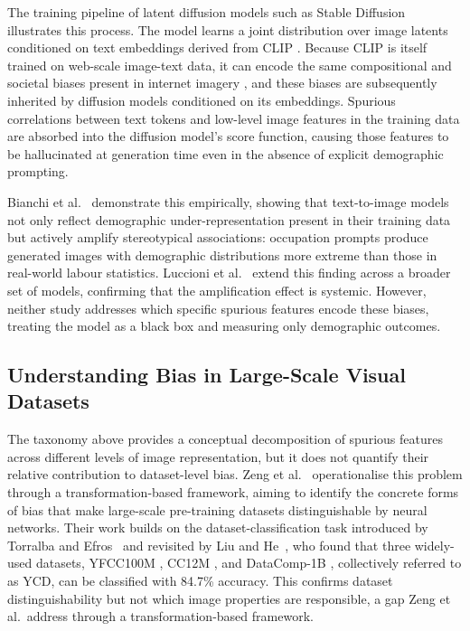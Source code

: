 The training pipeline of latent diffusion models such as Stable Diffusion
\cite{Rombach_2022_CVPR} illustrates this process. The model learns a joint distribution
over image latents conditioned on text embeddings derived from CLIP
\cite{Radford_2021_CLIP}. Because CLIP is itself trained on web-scale image-text data, it can encode the same
compositional and societal biases present in internet imagery
\cite{Birhane_2021_MultiModalDatasetsMisogynyPornography, Schuhmann_2022_Laion5b}, and
these biases are subsequently inherited by diffusion models conditioned on its embeddings.
Spurious correlations between text tokens and low-level image features in the training data
are absorbed into the diffusion model's score function, causing those features to be
hallucinated at generation time even in the absence of explicit demographic prompting.

Bianchi et al.~\cite{Bianchi_2023_TTIGenAmplifiesDemographicStereotypes} demonstrate this
empirically, showing that text-to-image models not only reflect demographic
under-representation present in their training data but actively amplify stereotypical
associations: occupation prompts produce generated images with demographic distributions
more extreme than those in real-world labour statistics. Luccioni et
al.~\cite{Luccioni_2023_AnalyzingSocietalRepresentationsDiffusionModels} extend this
finding across a broader set of models, confirming that the amplification effect is
systemic. However, neither study addresses which specific spurious features encode these
biases, treating the model as a black box and measuring only demographic
outcomes.

\subsection*{Understanding Bias in Large-Scale Visual Datasets}
\label{subsec:zeng2024}

The taxonomy above provides a conceptual decomposition of spurious features across
different levels of image representation, but it does not quantify their relative
contribution to dataset-level bias. Zeng et al.~\cite{Zeng_2024_UnderstandingBiasinLargeScaleVisualDatasets}
operationalise this problem through a transformation-based framework, aiming to identify the
concrete forms of bias that make large-scale pre-training datasets distinguishable by
neural networks. Their work builds on the dataset-classification task introduced by Torralba and Efros~\cite{Torralba_2011_UnbiasedLookDatasetBias} and revisited by Liu and
He~\cite{Liu_2024_DecadeBattleDatasetBias}, who found that three widely-used datasets,
YFCC100M \cite{Thomee_2016_YFCC100M}, CC12M \cite{Changpinyo_2021_CC12M}, and
DataComp-1B \cite{Gadre_2023_DataComp}, collectively referred to as YCD, can be classified
with 84.7\% accuracy. This confirms dataset distinguishability but not which image properties are responsible, a gap Zeng et al.\ address through a transformation-based framework.

